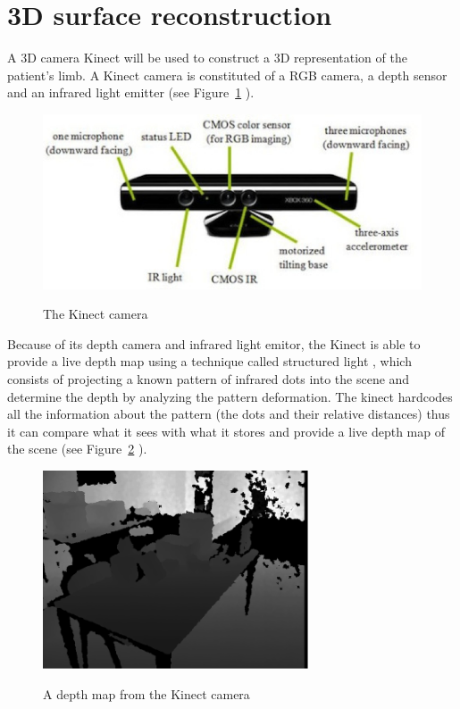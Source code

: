 \section{3D surface reconstruction}
\label{sec:3D surface reconstruction}
A 3D camera Kinect will be used to construct a 3D representation of the patient's limb.  A Kinect camera is constituted of a RGB camera, a depth sensor and an infrared light emitter (see Figure~\ref{fig:kinect} \cite{build}).\\

\begin{figure}[t]
\caption{The Kinect camera}
\centering
    \includegraphics[width=1.0\textwidth]{images/kinect.png}
\label{fig:kinect}
\end{figure}

Because of its depth camera and infrared light emitor, the Kinect is able to provide a live depth map using a technique called structured light \cite{freedman_depth_2008}, which consists of projecting a known pattern of infrared dots into the scene and determine the depth by analyzing the pattern deformation. The kinect hardcodes all the information about the pattern (the dots and their relative distances) thus it can compare what it sees with what it stores and provide a live depth map of the scene (see Figure~\ref{fig:depthMap} \cite{lejeune_new_2011}).\\

\begin{figure}[h]
\caption{A depth map from the Kinect camera}
\centering
    \includegraphics[width=0.7\textwidth]{images/depthMap.png}
\label{fig:depthMap}
\end{figure}

